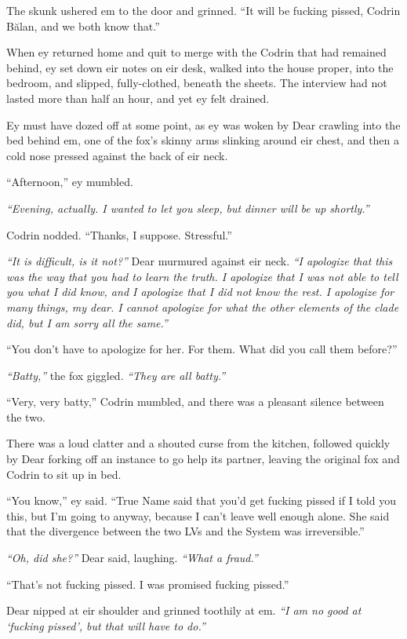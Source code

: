 The skunk ushered em to the door and grinned. ``It will be fucking pissed, Codrin Bălan, and we both know that.''

When ey returned home and quit to merge with the Codrin that had remained behind, ey set down eir notes on eir desk, walked into the house proper, into the bedroom, and slipped, fully-clothed, beneath the sheets. The interview had not lasted more than half an hour, and yet ey felt drained.

Ey must have dozed off at some point, as ey was woken by Dear crawling into the bed behind em, one of the fox's skinny arms slinking around eir chest, and then a cold nose pressed against the back of eir neck.

``Afternoon,'' ey mumbled.

\emph{``Evening, actually. I wanted to let you sleep, but dinner will be up shortly.''}

Codrin nodded. ``Thanks, I suppose. Stressful.''

\emph{``It is difficult, is it not?''} Dear murmured against eir neck. \emph{``I apologize that this was the way that you had to learn the truth. I apologize that I was not able to tell you what I did know, and I apologize that I did not know the rest. I apologize for many things, my dear. I cannot apologize for what the other elements of the clade did, but I am sorry all the same.''}

``You don't have to apologize for her. For them. What did you call them before?''

\emph{``Batty,''} the fox giggled. \emph{``They are all batty.''}

``Very, very batty,'' Codrin mumbled, and there was a pleasant silence between the two.

There was a loud clatter and a shouted curse from the kitchen, followed quickly by Dear forking off an instance to go help its partner, leaving the original fox and Codrin to sit up in bed.

``You know,'' ey said. ``True Name said that you'd get fucking pissed if I told you this, but I'm going to anyway, because I can't leave well enough alone. She said that the divergence between the two LVs and the System was irreversible.''

\emph{``Oh, did she?''} Dear said, laughing. \emph{``What a fraud.''}

``That's not fucking pissed. I was promised fucking pissed.''

Dear nipped at eir shoulder and grinned toothily at em. \emph{``I am no good at `fucking pissed', but that will have to do.''}

